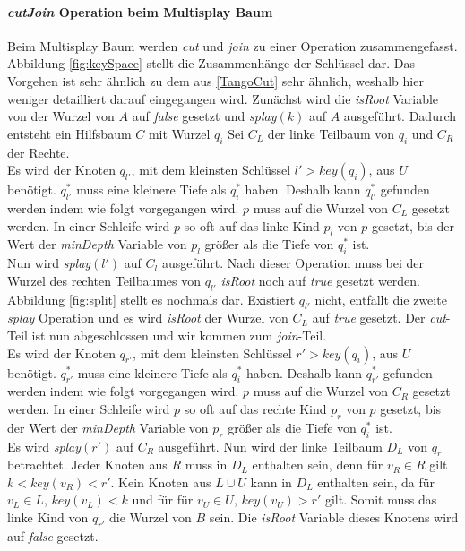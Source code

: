 \documentclass[a4paper,12pt]{article}
\begin{document}
\paragraph{\textit{cutJoin} Operation beim Multisplay Baum}
Beim Multisplay Baum werden \textit{cut} und \textit{join} zu einer Operation zusammengefasst. Abbildung \ref{fig:keySpace} stellt die Zusammenhänge der Schlüssel dar. Das Vorgehen ist sehr ähnlich zu dem aus \ref{TangoCut} sehr ähnlich, weshalb hier weniger detailliert darauf eingegangen wird.
Zunächst wird die \textit{isRoot} Variable von der Wurzel von $A$ auf \textit{false} gesetzt und \textit{splay}$\left(k\right)$ auf $A$ ausgeführt. Dadurch entsteht ein Hilfsbaum $C$ mit Wurzel $q_i$ Sei $C_L$ der linke Teilbaum von $q_i$ und $C_R$ der Rechte.\\
 Es wird der Knoten $q_{l'}$, mit dem kleinsten Schlüssel $l' > \textit{key}\left(q_i\right)$, aus $U$ benötigt.  $q_{l'}^*$ muss eine kleinere Tiefe als  $q_i^*$ haben. Deshalb kann $q_{l'}^*$ gefunden werden indem  wie folgt vorgegangen wird. $p$ muss auf die Wurzel von $C_L$ gesetzt werden. In einer Schleife wird $p$ so oft auf das linke Kind $p_l$ von $p$ gesetzt, bis der Wert der \textit{minDepth} Variable von $p_l$ größer als die Tiefe von $q_i^*$  ist.\\
 Nun wird \textit{splay}$\left(l'\right)$ auf $C_l$ ausgeführt. Nach dieser Operation muss bei der Wurzel des rechten Teilbaumes von $q_{l'}$ \textit{isRoot} noch auf \textit{true} gesetzt werden. Abbildung \ref{fig:split} stellt es nochmals dar. Existiert  $q_{l'}$ nicht, entfällt die zweite \textit{splay} Operation und es wird \textit{isRoot} der Wurzel von $C_L$ auf \textit{true} gesetzt. Der \textit{cut}-Teil ist nun abgeschlossen und wir kommen zum \textit{join}-Teil. \\
 Es wird der Knoten $q_{r'}$, mit dem kleinsten Schlüssel $r' > \textit{key}\left(q_i\right)$, aus $U$ benötigt.  $q_{r'}^*$ muss eine kleinere Tiefe als  $q_i^*$ haben. Deshalb kann $q_{r'}^*$ gefunden werden indem  wie folgt vorgegangen wird. $p$ muss auf die Wurzel von $C_R$ gesetzt werden. In einer Schleife wird $p$ so oft auf das rechte Kind $p_r$ von $p$ gesetzt, bis der Wert der \textit{minDepth} Variable von $p_r$ größer als die Tiefe von $q_i^*$  ist.\\
 Es wird \textit{splay}$\left(r'\right)$ auf $C_R$ ausgeführt. Nun wird der linke Teilbaum $D_L$ von $q_r$ betrachtet. Jeder Knoten aus $R$ muss in $D_L$ enthalten sein, denn für $v_R \in R$ gilt $k < \mathit{key}\left(v_R\right) < r'$. Kein Knoten aus $L \cup U$ kann in $D_L$ enthalten sein, da für $v_L \in  L$,  $ \mathit{key}\left(v_L\right) < k$ und für  für $v_U \in  U$,  $ \mathit{key}\left(v_U\right) > r'$ gilt. Somit muss das linke Kind von $q_{r'}$ die Wurzel von $B$ sein. Die \textit{isRoot} Variable dieses Knotens wird auf \textit{false} gesetzt.
\end{document}
